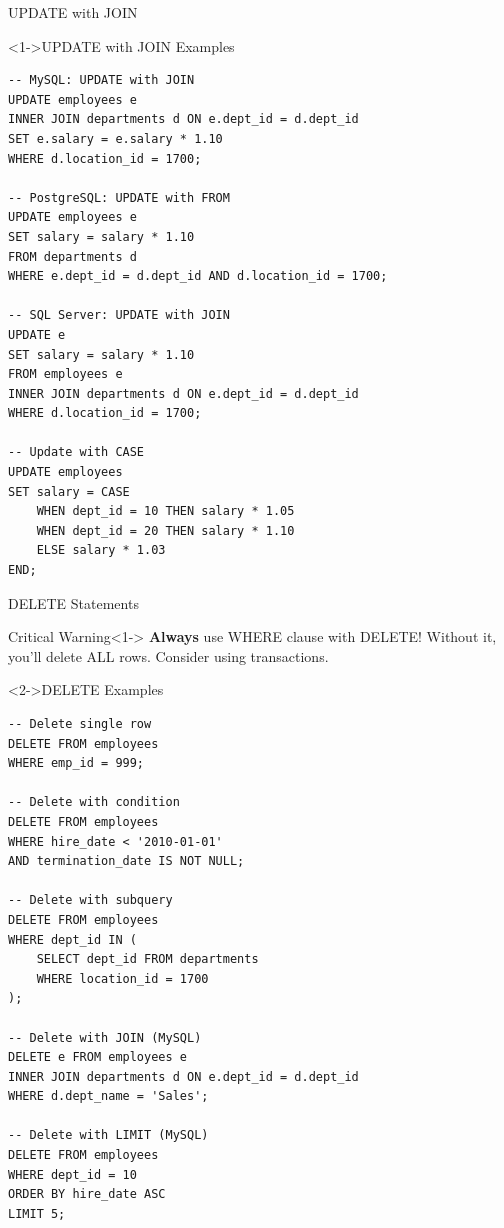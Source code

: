 \documentclass[aspectratio=169,11pt]{beamer}
\begin{document}
\begin{frame}[fragile]{UPDATE with JOIN}
\begin{exampleblock}<1->{UPDATE with JOIN Examples}
\begin{lstlisting}
-- MySQL: UPDATE with JOIN
UPDATE employees e
INNER JOIN departments d ON e.dept_id = d.dept_id
SET e.salary = e.salary * 1.10
WHERE d.location_id = 1700;

-- PostgreSQL: UPDATE with FROM
UPDATE employees e
SET salary = salary * 1.10
FROM departments d
WHERE e.dept_id = d.dept_id AND d.location_id = 1700;

-- SQL Server: UPDATE with JOIN
UPDATE e
SET salary = salary * 1.10
FROM employees e
INNER JOIN departments d ON e.dept_id = d.dept_id
WHERE d.location_id = 1700;

-- Update with CASE
UPDATE employees
SET salary = CASE
    WHEN dept_id = 10 THEN salary * 1.05
    WHEN dept_id = 20 THEN salary * 1.10
    ELSE salary * 1.03
END;
\end{lstlisting}
\end{exampleblock}
\end{frame}

\begin{frame}[fragile]{DELETE Statements}
\begin{alertblock}{\textcolor{red}{} Critical Warning}<1->
\textbf{Always} use WHERE clause with DELETE! Without it, you'll delete ALL rows. Consider using transactions.
\end{alertblock}

\pause
\begin{exampleblock}<2->{DELETE Examples}
\begin{lstlisting}
-- Delete single row
DELETE FROM employees
WHERE emp_id = 999;

-- Delete with condition
DELETE FROM employees
WHERE hire_date < '2010-01-01'
AND termination_date IS NOT NULL;

-- Delete with subquery
DELETE FROM employees
WHERE dept_id IN (
    SELECT dept_id FROM departments
    WHERE location_id = 1700
);

-- Delete with JOIN (MySQL)
DELETE e FROM employees e
INNER JOIN departments d ON e.dept_id = d.dept_id
WHERE d.dept_name = 'Sales';

-- Delete with LIMIT (MySQL)
DELETE FROM employees
WHERE dept_id = 10
ORDER BY hire_date ASC
LIMIT 5;
\end{lstlisting}
\end{exampleblock}
\end{frame}
\end{document}
